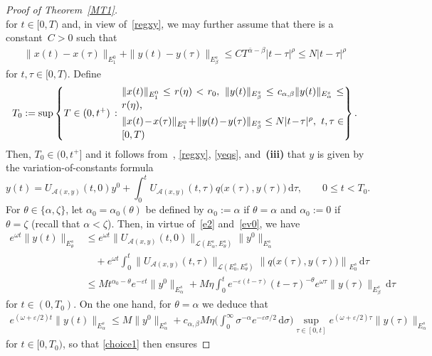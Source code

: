 \documentclass[reqno,11pt]{amsart}
\numberwithin{equation}{section}
\newcommand{\ve}{\varepsilon}
\newcommand{\rd}{\mathrm{d}}
\theoremstyle{remark}
\begin{document}
\begin{proof}[Proof of Theorem~\ref{MT1}]
$$$$  
for $t\in  [0,T)$ and, in view of~\eqref{regxy},  we may further assume that there is a constant~${C>0}$ such that 
\begin{align*}
\|x(t)-x(\tau)\|_{E_1^0}+\|y(t)-y(\tau)\|_{E_\beta^s}\le  C T^{ \bar \alpha -\beta}\vert t-\tau\vert^\rho\le N \vert t-\tau\vert^\rho
\end{align*}
for $t,\tau\in  [0,T)$. Define
\begin{align*}
T_0 := \sup \left\{ T \in (0,t^+) \,:\,
\begin{minipage}{0.65\linewidth}
$\|x(t)\|_{E_1^0} \le r(\eta) <r_0, \
\|y(t)\|_{ E_\beta^s} \le c_{\alpha,\beta}\|y(t)\|_{E_\alpha^s} \le r(\eta)$,\\[1ex]
$\|x(t)-x(\tau)\|_{E_1^0}
 + \|y(t)-y(\tau)\|_{E_\beta^s}
 \le N |t-\tau|^\rho,$ \ $ t,\tau \in [0,T)$
\end{minipage}
\right\}.
\end{align*}
Then,  $T_0\in (0,t^+]$ and it follows from~\cite[II.Remarks~2.1.2]{LQPP}, \eqref{regxy}, \eqref{yeqs},   and~{\bf (iii)} that $y$ is given by the variation-of-constants formula
$$
y(t)=U_{\mathcal{A}(x,y)}(t,0) y^0+\int_0^t U_{\mathcal{A}(x,y)}(t,\tau) q\big(x(\tau),y(\tau)\big)\,\rd \tau, \qquad 0\le t<T_0.
$$
 For $\theta\in \{\alpha,\zeta\}$, let $\alpha_0=\alpha_0(\theta)$ be defined by $\alpha_0:=\alpha$ if $\theta=\alpha$ and  $\alpha_0:=0$ if $\theta=\zeta$ (recall that $\alpha<\zeta$). 
 Then, in virtue of~\eqref{e2} and~\eqref{ev0}, we have
\begin{align*}
e^{\omega t}\|y(t)\|_{E_\theta^s}&\le e^{\omega t}\|U_{\mathcal{A}(x,y)}(t,0)\|_{\mathcal{L}(E_\alpha^s,E_\theta^s)}\| y^0\|_{E_\alpha^s}\\
&\quad +e^{\omega t}\int_0^t \|U_{\mathcal{A}(x,y)}(t,\tau)\|_{\mathcal{L}(E_0^s,E_\theta^s)} \left\|q\big(x(\tau),y(\tau)\big)\right\|_{E_0^s}\,\rd \tau \\
&\le M t^{\alpha_0-\theta}e^{-\ve t} \| y^0\|_{E_\alpha^s} + M \eta  \int_0^t e^{-\ve(t-\tau)}(t-\tau)^{-\theta} e^{\omega\tau}\|y(\tau)\|_{E_\beta^s}\,\rd \tau
\end{align*}
for $t\in (0,T_0)$. On the one hand, for $\theta=\alpha$ we deduce  that
\begin{align*}
e^{(\omega +\ve/2)t}\|y(t)\|_{E_\alpha^s}\le M  \| y^0\|_{E_\alpha^s} + c_{\alpha,\beta}M \eta  \Big(\int_0^\infty \sigma^{-\alpha} e^{-\ve\sigma/2}\,\rd \sigma \Big)\sup_{\tau\in[0,t]}e^{(\omega+\ve/2)\tau}\|y(\tau)\|_{E_\alpha^s}
\end{align*}
for $t\in [0,T_0)$,  so that \eqref{choice1} then ensures

\end{proof}
\end{document}
